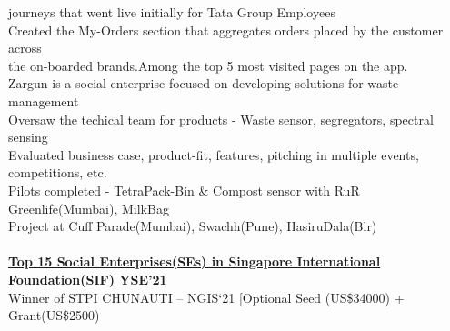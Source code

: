 \documentclass[]{deedy-resume-openfont}
\begin{document}
\begin{minipage}[t]{0.66\textwidth}
{\hspace{5mm} journeys that went live initially for Tata Group Employees\\
\hspace{2mm} \textbullet{} Created the My-Orders section that aggregates orders placed by the customer across\\
\hspace{5mm} the on-boarded brands.Among the top 5 most visited pages on the app.\\
}
\sectionsep
\vspace{0.5mm}
\vspace{1.5mm}
\small {
\hspace{2mm} \textbullet{} Zargun is a social enterprise focused on developing solutions for waste management\\
\hspace{2mm} \textbullet{} Oversaw the techical team for products - Waste sensor, segregators, spectral sensing\\
\hspace{2mm} \textbullet{} Evaluated business case, product-fit, features, pitching in multiple events, competitions, etc.\\
\hspace{2mm} \textbullet{} Pilots completed - TetraPack-Bin \& Compost sensor with RuR Greenlife(Mumbai), MilkBag\\
\hspace{4.5mm} Project at Cuff Parade(Mumbai), Swachh(Pune), HasiruDala(Blr) \\
\vspace{1mm}
\\
\hspace{2mm} \textbullet{} \textbf{\href{https://www.hindustantimes.com/brand-post/indian-social-enterprises-make-headway-at-sif-s-yse-global-programme-2021-101634649509304.html}{Top 15 Social Enterprises(SEs) in Singapore International Foundation(SIF) YSE'21 }\ExternalLink}\\
\hspace{2mm} \textbullet{} Winner of STPI CHUNAUTI – NGIS‘21 [Optional Seed (US\$34000) + Grant(US\$2500)\\
}
\end{minipage}
\end{document}
